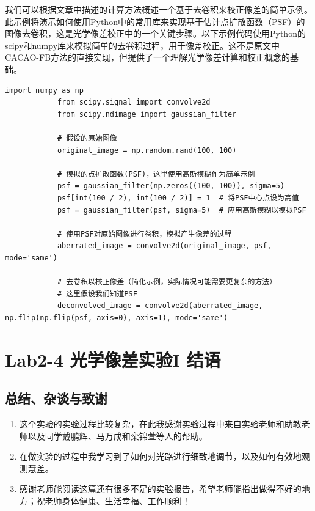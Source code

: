\documentclass[dvipsnames, svgnames,a4paper,11pt]{article}
\begin{document}
\begin{enumerate}
		我们可以根据文章中描述的计算方法概述一个基于去卷积来校正像差的简单示例。此示例将演示如何使用Python中的常用库来实现基于估计点扩散函数（PSF）的图像去卷积，这是光学像差校正中的一个关键步骤。以下示例代码使用Python的scipy和numpy库来模拟简单的去卷积过程，用于像差校正。这不是原文中CACAO-FB方法的直接实现，但提供了一个理解光学像差计算和校正概念的基础。
		
		\begin{lstlisting}[style=pythonstyle,caption=代码记录]
			import numpy as np
			from scipy.signal import convolve2d
			from scipy.ndimage import gaussian_filter
			
			# 假设的原始图像
			original_image = np.random.rand(100, 100)
			
			# 模拟的点扩散函数(PSF)，这里使用高斯模糊作为简单示例
			psf = gaussian_filter(np.zeros((100, 100)), sigma=5)
			psf[int(100 / 2), int(100 / 2)] = 1  # 将PSF中心点设为高值
			psf = gaussian_filter(psf, sigma=5)  # 应用高斯模糊以模拟PSF
			
			# 使用PSF对原始图像进行卷积，模拟产生像差的过程
			aberrated_image = convolve2d(original_image, psf, mode='same')
			
			# 去卷积以校正像差（简化示例，实际情况可能需要更复杂的方法）
			# 这里假设我们知道PSF
			deconvolved_image = convolve2d(aberrated_image, np.flip(np.flip(psf, axis=0), axis=1), mode='same')
		\end{lstlisting}		
	\end{enumerate}
	
	
	
	
	\section{Lab2-4 光学像差实验I \quad\heiti 结语}
	
	\subsection{总结、杂谈与致谢}
	\begin{enumerate}
		\item 这个实验的实验过程比较复杂，在此我感谢实验过程中来自实验老师和助教老师以及同学戴鹏辉、马万成和栾锦萱等人的帮助。
		\item 在做实验的过程中我学习到了如何对光路进行细致地调节，以及如何有效地观测慧差。
		\item 感谢老师能阅读这篇还有很多不足的实验报告，希望老师能指出做得不好的地方；祝老师身体健康、生活幸福、工作顺利！
	\end{enumerate}
	
\end{document}
